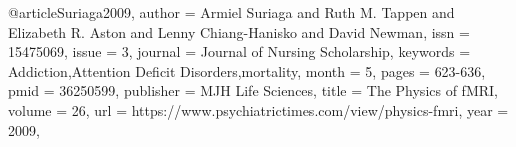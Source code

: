 @article{Suriaga2009,
   author = {Armiel Suriaga and Ruth M. Tappen and Elizabeth R. Aston and Lenny Chiang-Hanisko and David Newman},
   issn = {15475069},
   issue = {3},
   journal = {Journal of Nursing Scholarship},
   keywords = {Addiction,Attention Deficit Disorders,mortality},
   month = {5},
   pages = {623-636},
   pmid = {36250599},
   publisher = {MJH Life Sciences},
   title = {The Physics of fMRI},
   volume = {26},
   url = {https://www.psychiatrictimes.com/view/physics-fmri},
   year = {2009},
}